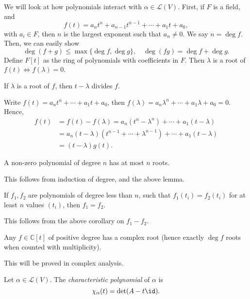 \documentclass[12pt]{article}
\begin{document}
We will look at how polynomials interact with $\alpha \in \mathcal{L}(V)$. First, if $F$ is a field, and
\[
	f(t) = a_n t^{n} + a_{n-1} t^{n-1} + \cdots + a_1 t + a_0
,\]
with $a_i \in F$, then $n$ is the largest exponent such that $a_n \neq 0$. We say $n = \deg f$. Then, we can easily show
\[
	\deg(f + g) \leq \max\{\deg f, \deg g\}, \quad \deg(fg) = \deg f + \deg g
.\]
Define $F[t]$ as the ring of polynomials with coefficients in $F$. Then $\lambda$ is a root of $f(t) \iff f(\lambda) = 0$.

\begin{lemma}
	If $\lambda$ is a root of $f$, then $t - \lambda$ divides $f$.
\end{lemma}

\begin{proofbox}
	Write $f(t) = a_nt^{n} + \cdots + a_1 t + a_0$, then $f(\lambda) = a_n \lambda^{n} + \cdots + a_1 \lambda + a_0 = 0$. Hence,
	\begin{align*}
		f(t) &= f(t) - f(\lambda) = a_n(t^{n} - \lambda^{n}) + \cdots + a_1(t - \lambda) \\
		     &= a_n(t - \lambda)(t^{n-1} + \cdots + \lambda^{n-1}) + \cdots + a_1(t - \lambda) \\
		     &= (t - \lambda)g(t).
	\end{align*}
\end{proofbox}

\begin{corollary}
	A non-zero polynomial of degree $n$ has at most $n$ roots.
\end{corollary}

This follows from induction of degree, and the above lemma.

\begin{corollary}
	If $f_1, f_2$ are polynomials of degree less than $n$, such that $f_1(t_i) = f_2(t_i)$ for at least $n$ values $(t_i)$, then $f_1 = f_2$.
\end{corollary}

This follows from the above corollary on $f_1 - f_2$.

\begin{theorem}
	Any $f \in \mathbb{C}[t]$ of positive degree has a complex root (hence exactly $\deg f$ roots when counted with multiplicity).
\end{theorem}

This will be proved in complex analysis.

\begin{definition}
	Let $\alpha \in \mathcal{L}(V)$. The \textit{characteristic polynomial} of $\alpha$ is
	\[
		\chi_{\alpha}(t) = \det(A - t \id)
	.\]
\end{definition}
\end{document}

